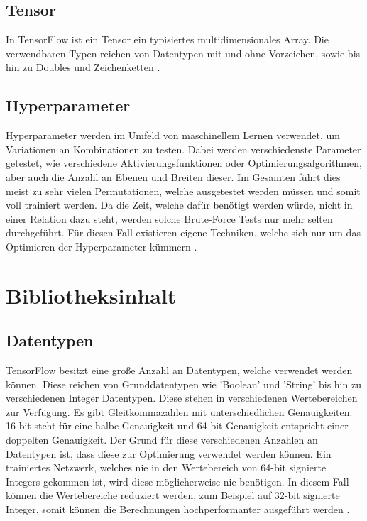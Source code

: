 \subsection{Tensor}

In TensorFlow ist ein Tensor ein typisiertes multidimensionales Array. 
Die verwendbaren Typen reichen von Datentypen mit und ohne Vorzeichen, sowie bis hin zu Doubles und Zeichenketten  \cite{wp2015tensorflow}. 

\subsection{Hyperparameter} 

Hyperparameter werden im Umfeld von maschinellem Lernen verwendet, um Variationen an Kombinationen zu testen. 
Dabei werden verschiedenste Parameter getestet, wie verschiedene Aktivierungsfunktionen oder Optimierungsalgorithmen, aber auch die Anzahl an Ebenen und Breiten dieser. 
Im Gesamten führt dies meist zu sehr vielen Permutationen, welche ausgetestet werden müssen und somit voll trainiert werden. 
Da die Zeit, welche dafür benötigt werden würde, nicht in einer Relation dazu steht, werden solche Brute-Force Tests nur mehr selten durchgeführt. 
Für diesen Fall existieren eigene Techniken, welche sich nur um das Optimieren der Hyperparameter kümmern \cite{bishop2006pattern}. 

\section{Bibliotheksinhalt}

\subsection{Datentypen}

TensorFlow besitzt eine große Anzahl an Datentypen, welche verwendet werden können. 
Diese reichen von Grunddatentypen wie 'Boolean' und 'String' bis hin zu verschiedenen Integer Datentypen. 
Diese stehen in verschiedenen Wertebereichen zur Verfügung. 
Es gibt Gleitkommazahlen mit unterschiedlichen Genauigkeiten. 16-bit steht für eine halbe Genauigkeit und 64-bit Genauigkeit entspricht einer doppelten Genauigkeit.
Der Grund für diese verschiedenen Anzahlen an Datentypen ist, dass diese zur Optimierung verwendet werden können. 
Ein trainiertes Netzwerk, welches nie in den Wertebereich von 64-bit signierte Integers gekommen ist, wird diese möglicherweise nie benötigen. 
In diesem Fall können die Wertebereiche reduziert werden, zum Beispiel auf 32-bit signierte Integer, somit können die Berechnungen hochperformanter ausgeführt werden \cite{TensorFlow}. 

